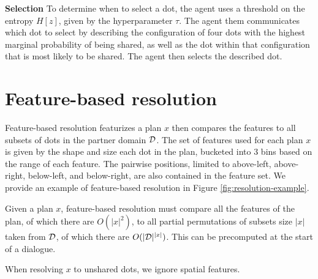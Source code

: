 \documentclass[11pt]{article}
\begin{document}
\textbf{Selection}
To determine when to select a dot, the agent uses a threshold on the entropy $H[z]$, given by the hyperparameter $\tau$.
The agent them communicates which dot to select by
describing the configuration of four dots with the
highest marginal probability of being shared,
as well as the dot within that configuration that is most likely to be shared.
The agent then selects the described dot.


\section{Feature-based resolution}
\label{sec:feature-resolution}
Feature-based resolution featurizes a plan $x$
then compares the features to all subsets of dots
in the partner domain $\mathcal{D}$.
The set of features used for each plan $x$ is given by the shape and size
each dot in the plan, bucketed into 3 bins based on the range of each feature.
The pairwise positions, limited to above-left, above-right, below-left, and below-right, are also contained in the feature set.
We provide an example of feature-based resolution in Figure
\ref{fig:resolution-example}.

Given a plan $x$, feature-based resolution
must compare all the features of the plan,
of which there are $O(|x|^2)$,
to all partial permutations of subsets size $|x|$ taken from $\mathcal{D}$,
of which there are $O(|\mathcal{D}|^{|x|})$.
This can be precomputed at the start of a dialogue.

When resolving $x$ to unshared dots, we ignore spatial features.
\end{document}
